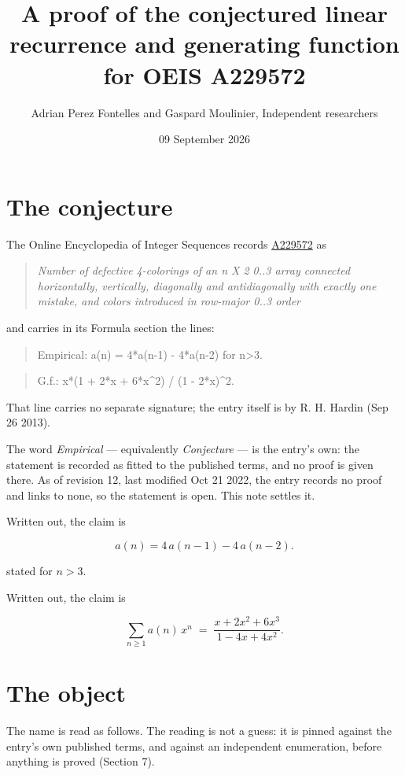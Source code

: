 \documentclass[11pt]{article}
\title{A proof of the conjectured linear recurrence and generating function for OEIS A229572}
\author{Adrian Perez Fontelles and Gaspard Moulinier, Independent researchers}
\date{09 September 2026}
\theoremstyle{definition}
\begin{document}
\maketitle
\section{The conjecture}

The Online Encyclopedia of Integer Sequences records \href{https://oeis.org/A229572}{A229572} as

\begin{quote}\itshape Number of defective 4-colorings of an n X 2 0..3 array connected horizontally, vertically, diagonally and antidiagonally with exactly one mistake, and colors introduced in row-major 0..3 order\end{quote}

and carries in its Formula section the lines:

\begin{quote}\ttfamily Empirical: a(n) = 4*a(n-1) - 4*a(n-2) for n>3.\end{quote}

\begin{quote}\ttfamily G.f.: x*(1 + 2*x + 6*x\textasciicircum{}2) / (1 - 2*x)\textasciicircum{}2.\end{quote}

That line carries no separate signature; the entry itself is by R. H. Hardin (Sep 26 2013).

The word {\itshape Empirical} --- equivalently {\itshape Conjecture} --- is the entry's own: the statement is recorded as fitted to the published terms, and no proof is given there. As of revision 12, last modified Oct 21 2022, the entry records no proof and links to none, so the statement is open. This note settles it.

Written out, the claim is

\[a(n) = 4\,a(n-1) - 4\,a(n-2).\]

stated for $n > 3$.

Written out, the claim is

\[\sum_{n \ge 1} a(n)\,x^n \;=\; \frac{x + 2x^{2} + 6x^{3}}{1 - 4x + 4x^{2}}.\]

\section{The object}

The name is read as follows. The reading is not a guess: it is pinned against the entry's own published terms, and against an independent enumeration, before anything is proved (Section 7).
\end{document}
